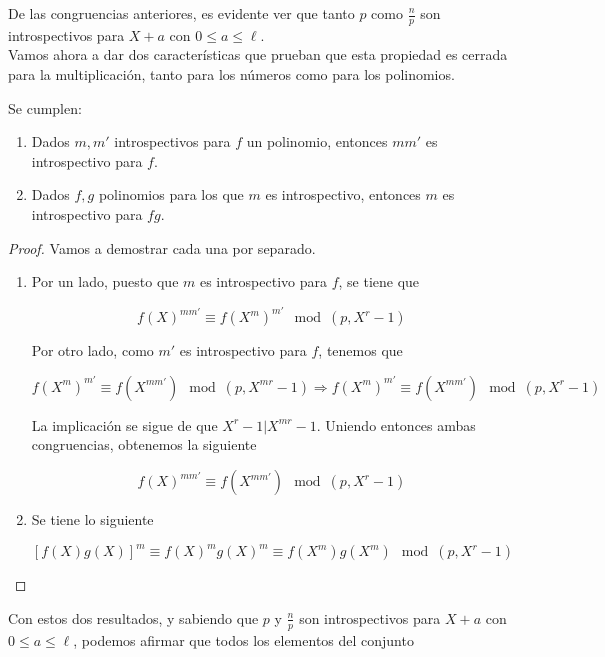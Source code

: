 De las congruencias anteriores, es evidente ver que tanto $p$ como $\frac{n}{p}$ son introspectivos para $X + a$ con $0 \leq a \leq \ell$.\\

Vamos ahora a dar dos características que prueban que esta propiedad es cerrada para la multiplicación, tanto para los números como para los polinomios.

\begin{lema}
	Se cumplen:
	
	\begin{enumerate}
		\item Dados $m, m'$ introspectivos para $f$ un polinomio, entonces $mm'$ es introspectivo para $f$.
		
		\item Dados $f, g$ polinomios para los que $m$ es introspectivo, entonces $m$ es introspectivo para $fg$. 
	\end{enumerate}
\end{lema}

\begin{proof}
	Vamos a demostrar cada una por separado.
	
	\begin{enumerate}
		\item Por un lado, puesto que $m$ es introspectivo para $f$, se tiene que
		
		\[ f(X)^{mm'} \equiv f(X^m)^{m'} \mod(p, X^r - 1) \]
		
		Por otro lado, como $m'$ es introspectivo para $f$, tenemos que
		
		\[ f(X^m)^{m'} \equiv f(X^{mm'}) \mod(p, X^{mr} - 1) \Rightarrow f(X^m)^{m'} \equiv f(X^{mm'}) \mod(p, X^r - 1) \]
		
		La implicación se sigue de que $X^r - 1 | X^{mr} - 1$. Uniendo entonces ambas congruencias, obtenemos la siguiente
		
		\[ f(X)^{mm'} \equiv f(X^{mm'}) \mod(p, X^r - 1) \]
		
		\item Se tiene lo siguiente
		
		\[ \left[f(X)g(X)\right]^m \equiv f(X)^mg(X)^m \equiv f(X^m)g(X^m) \mod(p, X^r - 1) \]
	\end{enumerate}
\end{proof}

Con estos dos resultados, y sabiendo que $p$ y $\frac{n}{p}$ son introspectivos para $X + a$ con $0 \leq a \leq \ell$, podemos afirmar que todos los elementos del conjunto

